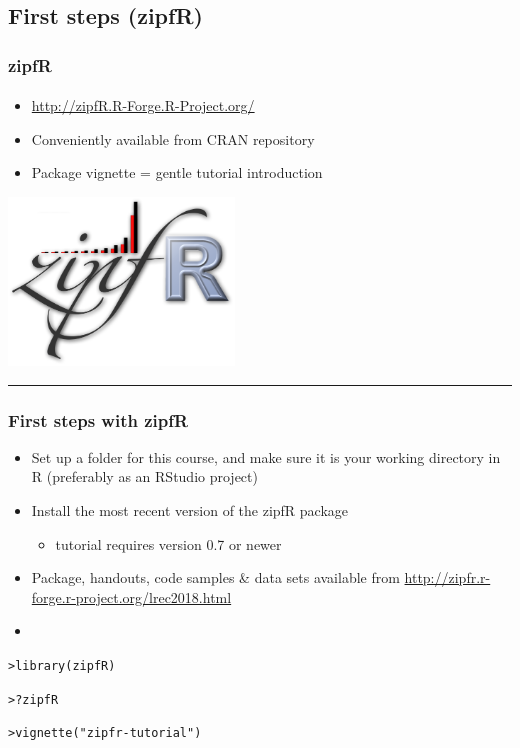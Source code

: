 \documentclass[t]{beamer} %
\begin{document}
\subsection{First steps (zipfR)}

\begin{frame}
  \frametitle{zipfR}
  \framesubtitle{\citet{Evert:Baroni:07}}

  \begin{itemize}
  \item \url{http://zipfR.R-Forge.R-Project.org/}
  \item Conveniently available from CRAN repository
  \item Package vignette = gentle tutorial introduction
  \end{itemize}

  \begin{flushright}
    \includegraphics[width=6cm]{img/zipfR_logo}
    \rule{5mm}{0mm}
  \end{flushright}

\end{frame}

\begin{frame}[fragile]
  \frametitle{First steps with zipfR}

  \begin{itemize}
  \item Set up a folder for this course, and make sure it is your working directory in R (preferably as an RStudio project)
  \item Install the most recent version of the zipfR package
    \begin{itemize}
    \item tutorial requires version 0.7 or newer
    \end{itemize}
  \item Package, handouts, code samples \& data sets available from \url{http://zipfr.r-forge.r-project.org/lrec2018.html}
  \item[]
  \end{itemize}
  
\begin{alltt}
> library(zipfR)

> ?zipfR  

> vignette("zipfr-tutorial")  
\end{alltt} 
\end{frame}
\end{document}
